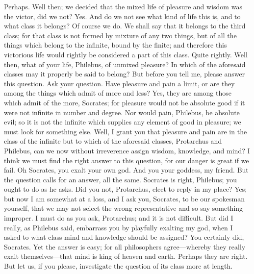 \documentclass[letterpaper,12pt]{article}
\newcommand{\stephpag}[1]{\marginnote{\small\itshape\fontfamily{ppl}\selectfont #1}}
\begin{document}
\begin{drama}
\protarchusspeaks
Perhaps. \stephpag{d}
\socratesspeaks
Well then; we decided that the mixed life of pleasure and wisdom was the victor, did we not?
\protarchusspeaks
Yes.
\socratesspeaks
And do we not see what kind of life this is, and to what class it belongs?
\protarchusspeaks
Of course we do.
\socratesspeaks
We shall say that it belongs to the third class; for that class is not formed by mixture of any two things, but of all the things which belong to the infinite, bound by the finite; and therefore this victorious life would rightly be considered a part of this class.
\protarchusspeaks
Quite rightly. \stephpag{e}
\socratesspeaks
Well then, what of your life, Philebus, of unmixed pleasure? In which of the aforesaid classes may it properly be said to belong? But before you tell me, please answer this question.
\philebusspeaks
Ask your question.
\socratesspeaks
Have pleasure and pain a limit, or are they among the things which admit of more and less?
\philebusspeaks
Yes, they are among those which admit of the more, Socrates; for pleasure would not be absolute good if it were not infinite in number and degree. \stephpag{28 a}
\socratesspeaks
Nor would pain, Philebus, be absolute evil; so it is not the infinite which supplies any element of good in pleasure; we must look for something else. Well, I grant you that pleasure and pain are in the class of the infinite but to which of the aforesaid classes, Protarchus and Philebus, can we now without irreverence assign wisdom, knowledge, and mind? I think we must find the right answer to this question, for our danger is great if we fail. \stephpag{b}
\philebusspeaks
Oh Socrates, you exalt your own god.
\socratesspeaks
And you your goddess, my friend. But the question calls for an answer, all the same.
\protarchusspeaks
Socrates is right, Philebus; you ought to do as he asks.
\philebusspeaks
Did you not, Protarchus, elect to reply in my place?
\protarchusspeaks
Yes; but now I am somewhat at a loss, and I ask you, Socrates, to be our spokesman yourself, that we may not select the wrong representative and so say something improper. \stephpag{c}
\socratesspeaks
I must do as you ask, Protarchus; and it is not difficult. But did I really, as Philebus said, embarrass you by playfully exalting my god, when I asked to what class mind and knowledge should be assigned?
\protarchusspeaks
You certainly did, Socrates.
\socratesspeaks
Yet the answer is easy; for all philosophers agree---whereby they really exalt themselves---that mind is king of heaven and earth. Perhaps they are right. But let us, if you please, investigate the question of its class more at length. \stephpag{d}

\end{drama}
\end{document}
